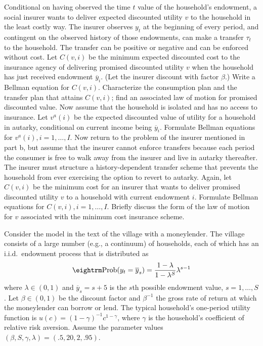 \medskip
{}  Conditional on having  observed the time $t$ value
of the household's endowment, a social insurer  wants to deliver expected
discounted utility $v$ to the household in the least costly way.  The
insurer observes $y_t$ at the beginning of every period,  and
contingent on the observed history of those endowments, can make a transfer
$\tau_t$ to the household.  The transfer can be positive or negative
and can be enforced without cost.   Let $C(v,i)$ be the minimum
expected discounted
cost to the insurance
agency of delivering promised discounted utility   $v$ when the household
has just received endowment $\overline y_i$.  (Let the insurer discount
with factor $\beta$.)
Write a Bellman equation for $C(v,i)$.
\medskip
{}  Characterize the    consumption plan and the transfer
plan that attains $C(v,i)$;  find an associated law of motion
for promised discounted value.
\medskip
{}  Now assume that the household is isolated and has
no access to insurance.  Let $v^a(i)$ be the expected discounted
value of utility for a household in autarky, conditional
on current income being $\overline y_i$.  Formulate  Bellman
equations for $v^a(i), i=1, \ldots, I$.
\medskip
{}  Now return to the problem of the insurer mentioned
in part b, but assume that the insurer cannot enforce  transfers because
each period the consumer is free to walk away from the insurer and
live in autarky thereafter.  The insurer must structure a history-dependent
transfer  scheme that prevents the  household from ever exercising the
option to revert to autarky.  Again, let $C(v,i)$ be
the minimum cost for an insurer that wants to deliver promised
discounted utility $v$  to a household with current endowment
$i$.  Formulate  Bellman equations for $C(v,i), i=1, \ldots, I$.
Briefly discuss the form of the law of motion for $v$ associated
with the minimum cost insurance scheme.

\medskip
\medskip
{} 
\medskip
\noindent
Consider the model in the text of the village with a moneylender.
The village consists of a large number (e.g., a continuum) of
households, each of which has an i.i.d.\ endowment process
that is distributed as
$$ {\rm Prob} (y_t = \overline y_s) = {1-\lambda\over 1-\lambda^S }
 \lambda^{s-1}  $$
where $\lambda \in (0,1)$ and $\overline y_s = s+5$ is
the $s$th  possible endowment value, $s=1, \ldots, S$.
Let $\beta\in (0,1)$ be the discount factor and
$\beta^{-1}$ the gross rate of return at which the moneylender
 can borrow or lend. The typical household's
one-period utility function is
$u(c) = (1-\gamma)^{-1} c^{1-\gamma}$, where $\gamma$ is the
household's coefficient of relative risk aversion.
Assume the parameter values $(\beta, S, \gamma, \lambda)
= (.5, 20, 2, .95)$.


